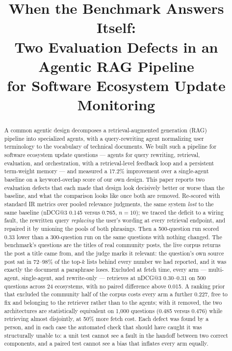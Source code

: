 \documentclass[10pt,conference]{IEEEtran}
\begin{document}
\title{When the Benchmark Answers Itself:\\
Two Evaluation Defects in an Agentic RAG Pipeline\\
for Software Ecosystem Update Monitoring}

\author{
}

\maketitle

\begin{abstract}
A common agentic design decomposes a retrieval-augmented generation (RAG)
pipeline into specialized agents, with a query-rewriting agent normalizing user
terminology to the vocabulary of technical documents. We built such a pipeline for
software ecosystem update questions --- agents for query rewriting, retrieval,
evaluation, and orchestration, with a retrieval-level feedback loop and a
persistent term-weight memory --- and measured a 17.2\% improvement over a
single-agent baseline on a keyword-overlap score of our own design. This paper
reports two evaluation defects that each made that design look decisively better
or worse than the baseline, and what the comparison looks like once both are
removed. Re-scored with standard IR metrics over pooled relevance judgments, the
same system \emph{lost} to the same baseline (nDCG@3 0.145 versus 0.765, $n=10$);
we traced the deficit to a wiring fault, the rewritten query \emph{replacing} the
user's wording at every retrieval endpoint, and repaired it by unioning the pools
of both phrasings. Then a 500-question run scored 0.33 lower than a 300-question
run on the same questions with nothing changed. The benchmark's questions are the
titles of real community posts, the live corpus returns the post a title came
from, and the judge marks it relevant: the question's own source post sat in
72--98\% of the top-$k$ lists behind every number we had reported, and it was
exactly the document a paraphrase loses. Excluded at fetch time, every arm ---
multi-agent, single-agent, and rewrite-only --- retrieves at nDCG@3 0.30--0.31 on
500 questions across 24 ecosystems, with no paired difference above 0.015. A
ranking prior that excluded the community half of the corpus costs every arm a
further 0.227, free to fix and belonging to the retriever rather than to the
agents; with it removed, the two architectures are statistically equivalent on
1{,}000 questions (0.485 versus 0.476) while retrieving almost disjointly, at 50\%
more fetch cost. Each defect was found by a person, and in each case the
automated check that should have caught it was structurally unable to: a unit test
cannot see a fault in the handoff between two correct components, and a paired
test cannot see a bias that inflates every arm equally.
\end{abstract}
\end{document}
